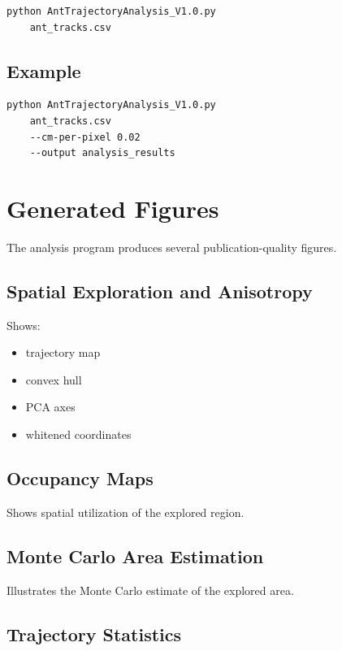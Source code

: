 \documentclass[11pt,a4paper]{article}
\begin{document}
\begin{verbatim}
python AntTrajectoryAnalysis_V1.0.py
    ant_tracks.csv
\end{verbatim}

\subsection{Example}

\begin{verbatim}
python AntTrajectoryAnalysis_V1.0.py
    ant_tracks.csv
    --cm-per-pixel 0.02
    --output analysis_results
\end{verbatim}

\section{Generated Figures}

The analysis program produces several publication-quality figures.

\subsection{Spatial Exploration and Anisotropy}

Shows:

\begin{itemize}
\item trajectory map
\item convex hull
\item PCA axes
\item whitened coordinates
\end{itemize}

\subsection{Occupancy Maps}

Shows spatial utilization of the explored region.

\subsection{Monte Carlo Area Estimation}

Illustrates the Monte Carlo estimate of the explored area.

\subsection{Trajectory Statistics}
\end{document}
